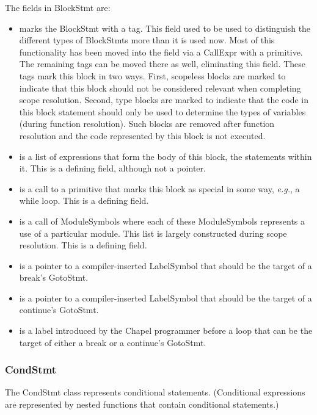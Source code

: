 \documentclass[10pt]{article}
\newcommand{\eg}{\emph{e.g.}}
\begin{document}
The fields in BlockStmt are:
\begin{itemize}
\item {} marks the BlockStmt with a tag.  This
  field used to be used to distinguish the different types of
  BlockStmts more than it is used now.  Most of this functionality has
  been moved into the  field via a CallExpr with a primitive.
  The remaining tags can be moved there as well, eliminating this
  field.  These tags mark this block in two ways.  First, scopeless
  blocks are marked to indicate that this block should not be
  considered relevant when completing scope resolution.  Second, type
  blocks are marked to indicate that the code in this block statement
  should only be used to determine the types of variables (during
  function resolution).  Such blocks are removed after function
  resolution and the code represented by this block is not executed.
\item {} is a list of expressions that form the body of
  this block, the statements within it.
  This is a defining field, although not a pointer.
\item {} is a call to a primitive that marks
  this block as special in some way, \eg, a while loop.
  This is a defining field.
\item {} is a call of ModuleSymbols where each of
  these ModuleSymbols represents a use of a particular module.  This
  list is largely constructed during scope resolution.
  This is a defining field.
\item {} is a pointer to a compiler-inserted
  LabelSymbol that should be the target of a break's GotoStmt.
\item {} is a pointer to a
  compiler-inserted LabelSymbol that should be the target of a
  continue's GotoStmt.
\item {} is a label introduced by the Chapel
  programmer before a loop that can be the target of either a break or
  a continue's GotoStmt.
\end{itemize}

\subsubsection{CondStmt}
\label{sec:condstmt}

The CondStmt class represents conditional statements. (Conditional
expressions are represented by nested functions that contain
conditional statements.)
\end{document}
